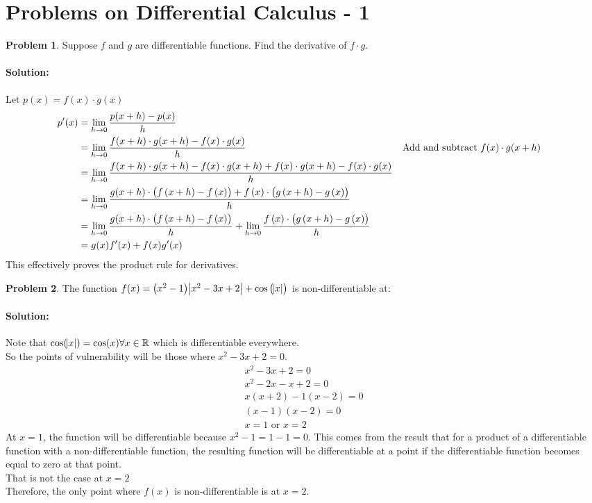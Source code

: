 \documentclass[14]{article}
\theoremstyle{definition}
\newtheorem{prob}{Problem}
\begin{document}
\section{Problems on Differential Calculus - 1}
\begin{prob}
Suppose $f$ and $g$ are differentiable functions. Find the derivative of $f \cdot g$.
\paragraph{Solution:} Let $p(x) = f(x) \cdot g(x)$
\begin{align*}
p'(x) &= \lim\limits_{h \to 0} \dfrac{p(x + h) - p(x)}{h}\\
&= \lim\limits_{h \to 0} \dfrac{f(x + h)\cdot g(x+h) - f(x)\cdot g(x)}{h} && \parbox[t]{5cm}{Add and subtract $f(x)\cdot g(x+h)$}\\
&= \lim\limits_{h \to 0} \dfrac{f(x + h)\cdot g(x+h) - f(x)\cdot g(x+h) + f(x)\cdot g(x+h) - f(x)\cdot g(x)}{h}\\
&= \lim\limits_{h \to 0} \dfrac{g(x+h)\cdot\left(f\left(x + h\right) - f\left(x\right)\right) + f\left(x\right)\cdot \left(g\left(x+h\right) - g\left(x\right)\right)}{h}\\
&= \lim\limits_{h \to 0} \dfrac{g(x+h)\cdot\left(f\left(x + h\right) - f\left(x\right)\right)}{h} + \lim\limits_{h \to 0} \dfrac{f\left(x\right)\cdot \left(g\left(x+h\right) - g\left(x\right)\right)}{h}\\
&= g(x) f'(x) + f(x) g'(x)
\end{align*}
This effectively proves the product rule for derivatives.\\
\end{prob}
\begin{prob}
The function
$f(x) = \left(x^2 - 1\right) \abs{x^2 -3x + 2} + \cos\left(\abs{x}\right)$ is non-differentiable at:\\
\paragraph{Solution:}
Note that $\cos(\abs{x}) = \cos(x) \forall x \in \mathbb{R}$ which is differentiable everywhere.\\
So the points of vulnerability will be those where $x^2 - 3x + 2 = 0$.
\begin{align*}
x^2 - 3x + 2 = 0\\
x^2 - 2x - x + 2 = 0\\
x(x + 2) - 1(x-2) = 0\\
(x-1)(x-2) = 0\\
x = 1 \text{ or } x = 2
\end{align*}
At $x = 1$, the function will be differentiable because $x^2 -1 = 1 - 1 = 0$. This comes from the result that for a product of a differentiable function with a non-differentiable function, the resulting function will be differentiable at a point if the differentiable function becomes equal to zero at that point.\\
That is not the case at $x = 2$\\
Therefore, the only point where $f(x)$ is non-differentiable is at $x = 2$.
\end{prob}
\end{document}

